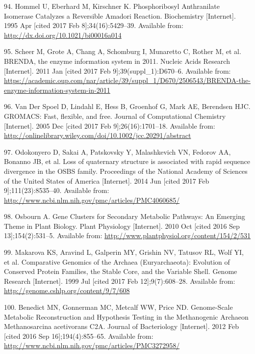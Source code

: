 \documentclass[12pt,twoside]{reedthesis}
\begin{document}
  \hypertarget{ref-hommel_phosphoribosyl_1995}{}
  94. Hommel U, Eberhard M, Kirschner K. Phosphoribosyl Anthranilate
  Isomerase Catalyzes a Reversible Amadori Reaction. Biochemistry
  {[}Internet{]}. 1995 Apr {[}cited 2017 Feb 8{]};34(16):5429--39.
  Available from: \url{http://dx.doi.org/10.1021/bi00016a014}
  
  \hypertarget{ref-scheer_brenda_2011}{}
  95. Scheer M, Grote A, Chang A, Schomburg I, Munaretto C, Rother M, et
  al. BRENDA, the enzyme information system in 2011. Nucleic Acids
  Research {[}Internet{]}. 2011 Jan {[}cited 2017 Feb
  9{]};39(suppl\_1):D670--6. Available from:
  \url{https://academic.oup.com/nar/article/39/suppl_1/D670/2506543/BRENDA-the-enzyme-information-system-in-2011}
  
  \hypertarget{ref-van_der_spoel_gromacs_2005}{}
  96. Van Der Spoel D, Lindahl E, Hess B, Groenhof G, Mark AE, Berendsen
  HJC. GROMACS: Fast, flexible, and free. Journal of Computational
  Chemistry {[}Internet{]}. 2005 Dec {[}cited 2017 Feb
  9{]};26(16):1701--18. Available from:
  \url{http://onlinelibrary.wiley.com/doi/10.1002/jcc.20291/abstract}
  
  \hypertarget{ref-odokonyero_loss_2014}{}
  97. Odokonyero D, Sakai A, Patskovsky Y, Malashkevich VN, Fedorov AA,
  Bonanno JB, et al. Loss of quaternary structure is associated with rapid
  sequence divergence in the OSBS family. Proceedings of the National
  Academy of Sciences of the United States of America {[}Internet{]}. 2014
  Jun {[}cited 2017 Feb 9{]};111(23):8535--40. Available from:
  \url{http://www.ncbi.nlm.nih.gov/pmc/articles/PMC4060685/}
  
  \hypertarget{ref-osbourn_gene_2010}{}
  98. Osbourn A. Gene Clusters for Secondary Metabolic Pathways: An
  Emerging Theme in Plant Biology. Plant Physiology {[}Internet{]}. 2010
  Oct {[}cited 2016 Sep 13{]};154(2):531--5. Available from:
  \url{http://www.plantphysiol.org/content/154/2/531}
  
  \hypertarget{ref-makarova_comparative_1999}{}
  99. Makarova KS, Aravind L, Galperin MY, Grishin NV, Tatusov RL, Wolf
  YI, et al. Comparative Genomics of the Archaea (Euryarchaeota):
  Evolution of Conserved Protein Families, the Stable Core, and the
  Variable Shell. Genome Research {[}Internet{]}. 1999 Jul {[}cited 2017
  Feb 12{]};9(7):608--28. Available from:
  \url{http://genome.cshlp.org/content/9/7/608}
  
  \hypertarget{ref-benedict_genome-scale_2012}{}
  100. Benedict MN, Gonnerman MC, Metcalf WW, Price ND. Genome-Scale
  Metabolic Reconstruction and Hypothesis Testing in the Methanogenic
  Archaeon Methanosarcina acetivorans C2A. Journal of Bacteriology
  {[}Internet{]}. 2012 Feb {[}cited 2016 Sep 16{]};194(4):855--65.
  Available from:
  \url{http://www.ncbi.nlm.nih.gov/pmc/articles/PMC3272958/}
  
\end{document}

